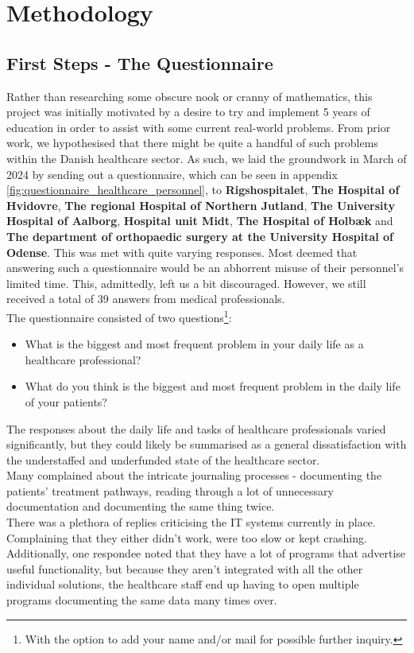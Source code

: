 \section{Methodology}
\subsection{First Steps - The Questionnaire}
Rather than researching some obscure nook or cranny of mathematics, this project was initially motivated by a desire to try and implement 5 years of education in order to assist with some current real-world problems. From prior work, we hypothesised that there might be quite a handful of such problems within the Danish healthcare sector. As such, we laid the groundwork in March of 2024 by sending out a questionnaire, which can be seen in appendix \autoref{fig:questionnaire_healthcare_personnel}, to \textbf{Rigshospitalet}, \textbf{The Hospital of Hvidovre}, \textbf{The regional Hospital of Northern Jutland}, \textbf{The University Hospital of Aalborg}, \textbf{Hospital unit Midt}, \textbf{The Hospital of Holbæk} and \textbf{The department of orthopaedic surgery at the University Hospital of Odense}. This was met with quite varying responses. Most deemed that answering such a questionnaire would be an abhorrent misuse of their personnel's limited time. This, admittedly, left us a bit discouraged. However, we still received a total of 39 answers from medical professionals.
\\
The questionnaire consisted of two questions\footnote{With the option to add your name and/or mail for possible further inquiry.}:
\begin{itemize}
    \item What is the biggest and most frequent problem in your daily life as a healthcare professional?
    \item What do you think is the biggest and most frequent problem in the daily life of your patients?
\end{itemize}
The responses about the daily life and tasks of healthcare professionals varied significantly, but they could likely be summarised as a general dissatisfaction with the understaffed and underfunded state of the healthcare sector.
\\
Many complained about the intricate journaling processes - documenting the patients' treatment pathways, reading through a lot of unnecessary documentation and documenting the same thing twice. 
\\
There was a plethora of replies criticising the IT systems currently in place. Complaining that they either didn't work, were too slow or kept crashing. Additionally, one respondee noted that they have a lot of programs that advertise useful functionality, but because they aren't integrated with all the other individual solutions, the healthcare staff end up having to open multiple programs documenting the same data many times over.

